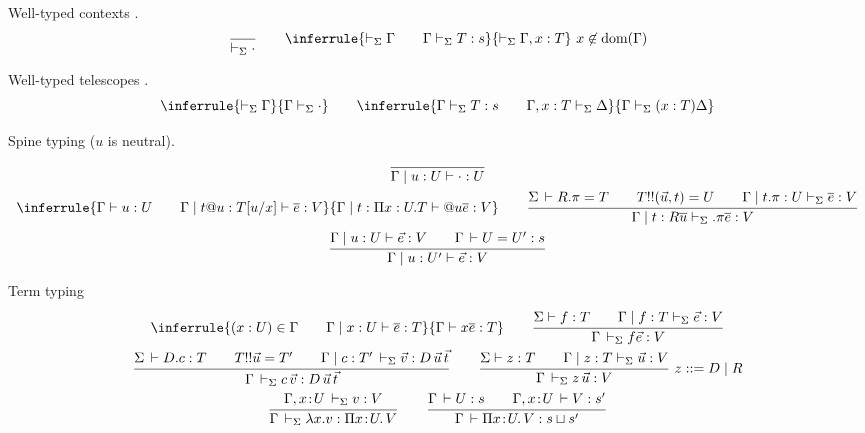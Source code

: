 \documentclass[acmlarge]{acmart}\settopmatter{}
\DeclareMathOperator{\dom}{dom}
\DeclareMathOperator{\proj}{proj}
\renewcommand{\|}{\mid}
\begin{document}
Well-typed contexts \fbox{$\vdash_\Sigma \Gamma$}.
\[
\ru{}{\vdash_\Sigma \cdot}
\qquad
\inferrule
  {\vdash_\Sigma \Gamma \qquad \Gamma \vdash_\Sigma T:s}
  {\vdash_\Sigma \Gamma, x : T} \ x \not\in \dom(\Gamma)
\]

Well-typed telescopes \fbox{$\Gamma \vdash_\Sigma \Delta$}.
\[
\inferrule
  {\vdash_\Sigma \Gamma}
  {\Gamma \vdash_\Sigma \cdot}
\qquad
\inferrule{\Gamma \vdash_\Sigma T : s \qquad \Gamma, x:T \vdash_\Sigma \Delta}
{\Gamma \vdash_\Sigma (x:T) \Delta}
\]

Spine typing \fbox{$\Gamma \| u : U \vdash \overline{e} : T$}
($u$ is neutral).
\begin{gather*}
\ru{}
{\Gamma \| u:U \vdash \cdot : U}
\\
\inferrule
  {\Gamma \vdash u:U \qquad \Gamma \| t@u:T[u/x] \vdash \overline{e} : V}
  {\Gamma \| t : \Pi x:U.T \vdash @u \overline{e}:V}
\qquad
\ru{\Sigma \der R.\pi = T \qquad
    T !! (\vec u,t) = U \qquad
    \Gamma \| t.\pi : U \vdash_\Sigma \overline{e} : V
  }{\Gamma \| t : R \overline{u}  \vdash_\Sigma .\pi \overline{e} : V}
\\
\ru{\Gamma \mid u : U \vdash \vec e : V \qquad
    \Gamma \der U = U' : s
  }{\Gamma \mid u : U' \vdash \vec e : V}
\end{gather*}


Term typing 
\begin{gather*}
\inferrule
  {(x:U)\in \Gamma \qquad \Gamma \mid x:U \vdash \overline{e}:T}
  {\Gamma \vdash x \overline{e} : T}
\qquad
\ru{\Sigma \vdash f : T \qquad
    \Gamma \mid f : T \vdash_\Sigma \vec e : V
   }{\Gamma \der_\Sigma f \vec e : V}
\\
\ru{\Sigma \der D.c : T \qquad
    T !! \vec u = T' \qquad
    \Gamma \mid c : T' \der_\Sigma \vec v : D \, \vec u \, \vec t
  }{\Gamma \der_\Sigma c\,\vec v : D\,\vec u\,\vec t}
\qquad
\ru{\Sigma \vdash z : T \qquad
    \Gamma \mid z : T \vdash_\Sigma \vec u : V
   }{\Gamma \der_\Sigma z \, \vec u : V} \ z ::= D \mid R
\\
\ru{\Gamma, x \of U \der_\Sigma v : V
  }{\Gamma \der_\Sigma \lambda x.v : \funT x U V}
\qquad
\ru{\Gamma \der U : s \qquad
    \Gamma, x \of U \der V : s'
  }{\Gamma \der \piT x U V : s \sqcup s'}
\end{gather*}
\end{document}
